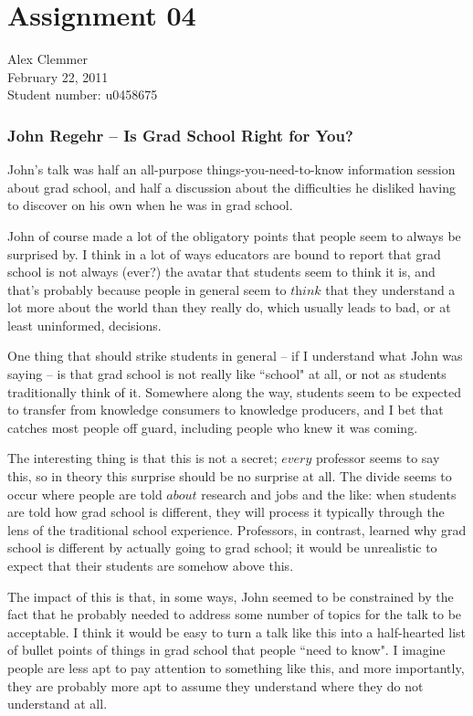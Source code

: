 \documentclass[a4paper]{article}
\begin{document}
\section*{Assignment 04}
Alex Clemmer\\
February 22, 2011\\
Student number: u0458675

\subsubsection*{John Regehr -- Is Grad School Right for You?}

John's talk was half an all-purpose things-you-need-to-know information session about grad school, and half a discussion about the difficulties he disliked having to discover on his own when he was in grad school.

John of course made a lot of the obligatory points that people seem to always be surprised by. I think in a lot of ways educators are bound to report that grad school is not always (ever?) the avatar that students seem to think it is, and that's probably because people in general seem to  $\textit{think}$ that they understand a lot more about the world than they really do, which usually leads to bad, or at least uninformed, decisions.

One thing that should strike students in general -- if I understand what John was saying -- is that grad school is not really like ``school" at all, or not as students traditionally think of it. Somewhere along the way, students seem to be expected to transfer from knowledge consumers to knowledge producers, and I bet that catches most people off guard, including people who knew it was coming.

The interesting thing is that this is not a secret; $\textit{every}$ professor seems to say this, so in theory this surprise should be no surprise at all. The divide seems to occur where people are told $\textit{about}$ research and jobs and the like: when students are told how grad school is different, they will process it typically through the lens of the traditional school experience. Professors, in contrast, learned why grad school is different by actually going to grad school; it would be unrealistic to expect that their students are somehow above this.

The impact of this is that, in some ways, John seemed to be constrained by the fact that he probably needed to address some number of topics for the talk to be acceptable. I think it would be easy to turn a talk like this into a half-hearted list of bullet points of things in grad school that people ``need to know". I imagine people are less apt to pay attention to something like this, and more importantly, they are probably more apt to assume they understand where they do not understand at all.
\end{document}
